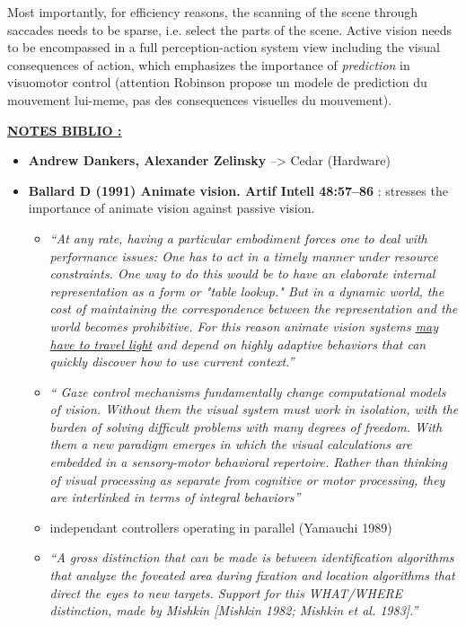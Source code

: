 \documentclass[12pt,twoside,openright]{article}
\begin{document}
	{\color{blue} Most importantly, for efficiency reasons, the scanning of the scene through saccades needs to be sparse, i.e. select the parts of the scene.
	Active vision needs to be encompassed in a full perception-action system view including the visual consequences of action, which emphasizes the importance of \emph{prediction} in visuomotor control \cite{Robinson1975,berthoz1996neural}} {\color{green} (attention Robinson propose un modele de prediction du mouvement lui-meme, pas des consequences visuelles du mouvement).}

    {\color{magenta} \uline{\bf NOTES BIBLIO  :}
    \begin{itemize}
    	\item {\bf Andrew Dankers, Alexander Zelinsky} --> Cedar (Hardware)
    	\item {\bf Ballard D (1991) Animate vision. Artif Intell 48:57–86} : stresses the importance of animate vision against passive vision. 
    	\begin{itemize}
    		\item \emph{``At any rate, having a particular embodiment forces
    			one to deal with performance issues: One has to act in a timely manner under resource constraints.
    			One way to do this would be to have an elaborate internal representation as a form or "table lookup." But in a dynamic world, the cost of maintaining the correspondence between the representation and the world becomes prohibitive. For this reason animate vision systems \uline{may have to travel light} and depend on highly adaptive behaviors that can quickly discover how to use current context.''}
    		\item \emph{`` Gaze control mechanisms fundamentally change computational models of vision. Without
    			them the visual system must work in isolation, with the burden of solving difficult problems with
    			many degrees of freedom. With them a new paradigm emerges in which the visual calculations are
    			embedded in a sensory-motor behavioral repertoire. Rather than thinking of visual
    			processing as separate from cognitive or motor processing, they are interlinked
    			in terms of integral behaviors''}
    		\item independant controllers operating in parallel	(Yamauchi 1989)
    		\item \emph{``A gross distinction that
    			can be made is between identification algorithms that analyze the foveated area during fixation and
    			location algorithms that direct the eyes to new targets. Support for this WHAT/WHERE distinction, made by Mishkin [Mishkin 1982; Mishkin et al. 1983].''}

\end{itemize}
\end{itemize}}
\end{document}
